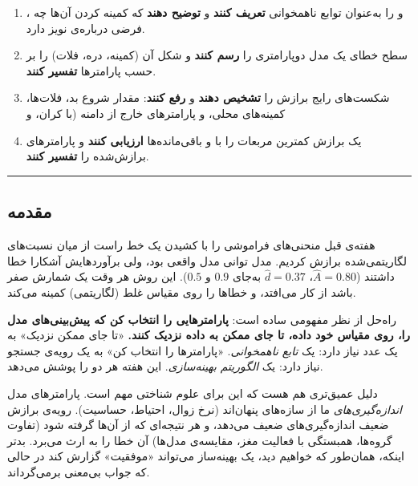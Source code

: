 \begin{enumerate}
\def\labelenumi{\arabic{enumi}.}
\tightlist
\item
  ،  و  را به‌عنوان توابع ناهمخوانی
   \textbf{تعریف کنند} و \textbf{توضیح دهند}
  که کمینه کردن آن‌ها چه فرضی درباره‌ی نویز دارد.
\item
  سطح خطای یک مدل دوپارامتری را \textbf{رسم کنند} و شکل آن (کمینه، دره،
  فلات) را بر حسب  پارامترها \textbf{تفسیر کنند}.
\item
  شکست‌های رایج برازش را \textbf{تشخیص دهند} و \textbf{رفع کنند}: مقدار
  شروع بد، فلات‌ها، کمینه‌های محلی، و پارامترهای خارج از دامنه (با کران،
   و 
\item
  یک برازش کمترین مربعات را با  و باقی‌مانده‌ها \textbf{ارزیابی
  کنند} و پارامترهای برازش‌شده را \textbf{تفسیر کنند}.
\end{enumerate}

\begin{center}\rule{0.5\linewidth}{0.5pt}\end{center}

\subsection{مقدمه}

هفته‌ی قبل منحنی‌های فراموشی را با کشیدن یک خط راست از میان نسبت‌های
لگاریتمی‌شده برازش کردیم. مدل توانی مدل واقعی بود، ولی برآوردهایش آشکارا
خطا داشتند (\(\hat A = 0.80\)، \(\hat d = 0.37\) به‌جای \(0.9\) و
\(0.5\)). این روش هر وقت یک شمارش صفر باشد از کار می‌افتد، و خطاها را روی
مقیاس غلط (لگاریتمی) کمینه می‌کند.

راه‌حل از نظر مفهومی ساده است: \textbf{پارامترهایی را انتخاب کن که
پیش‌بینی‌های مدل را، روی مقیاس خود داده، تا جای ممکن به داده نزدیک کنند.}
«تا جای ممکن نزدیک» به یک عدد نیاز دارد: یک \emph{تابع ناهمخوانی}.
«پارامترها را انتخاب کن» به یک رویه‌ی جستجو نیاز دارد: یک \emph{الگوریتم
بهینه‌سازی}. این هفته هر دو را پوشش می‌دهد.

دلیل عمیق‌تری هم هست که این برای علوم شناختی مهم است. پارامترهای مدل
\emph{اندازه‌گیری‌های} ما از سازه‌های پنهان‌اند (نرخ زوال، احتیاط، حساسیت).
رویه‌ی برازش ضعیف اندازه‌گیری‌های ضعیف می‌دهد، و هر نتیجه‌ای که از آن‌ها گرفته
شود (تفاوت گروه‌ها، همبستگی با فعالیت مغز، مقایسه‌ی مدل‌ها) آن خطا را به
ارث می‌برد. بدتر اینکه، همان‌طور که خواهیم دید، یک بهینه‌ساز می‌تواند
«موفقیت» گزارش کند در حالی که جواب بی‌معنی برمی‌گرداند.

